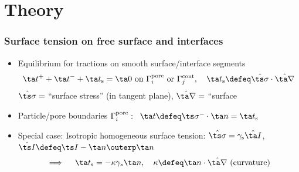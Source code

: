 \documentclass[11pt]{beamer} %
\newcommand{\surf}{\mathrm{s}}
\newcommand{\roughcite}[1]{\textsc{#1}}
\begin{document}
\section{Theory}
\begin{frame}
 \frametitle{Surface tension on free surface and interfaces}
\small
 \vspace{-1em}
 \begin{center}
  \scalebox{0.75}{}
  \hspace{0.5em}
  \scalebox{0.75}{}
 \end{center}
\vspace{-1em}
\begin{itemize}
 \item Equilibrium for tractions on smooth surface/interface segments
\vspace{-0.7em}
\begin{align*}
 \ta t^+ + \ta t^- + \ta t_\surf = \ta 0 \text{ on } \Gamma_i^{\mathrm{pore}} \text{ or } \Gamma_j^{\mathrm{cont}},\quad \ta t_\surf \defeq \hat{\ts\sigma}\cdot\hat{\ta\nabla}
\end{align*}
$\hat{\ts\sigma} =$ ``surface stress'' (in tangent plane), $\hat{\ta\nabla} =$ ``surface 
 \item Particle/pore boundaries $\Gamma_i^{\mathrm{pore}}:\;\;\ta t\defeq \ts\sigma^-\cdot\ta n = \ta t_\surf$
\item Special case: Isotropic homogeneous surface tension: $\hat{\ts\sigma}=\gamma_\surf \hat{\ta I}$, $\hat{\ts I}\defeq\ts I-\ta n\outerp\ta n$ \vspace{-0.5em}
\begin{align*}
 \implies\quad \ta t_\surf = - \kappa \gamma_s \ta n,\quad \kappa \defeq \ta n \cdot \hat{\ta\nabla} \text{ (curvature)}
\end{align*}
\end{itemize}
\end{frame}
\end{document}
